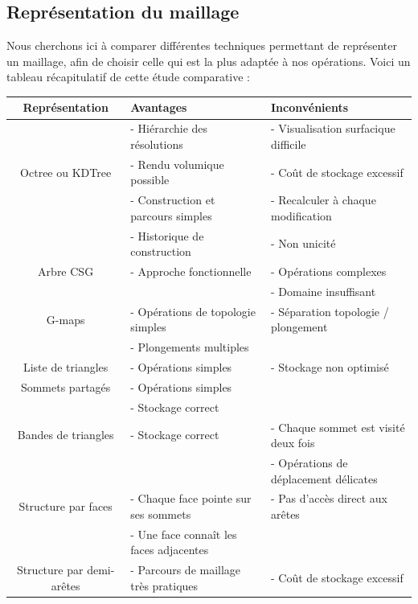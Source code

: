 \documentclass[a4paper]{memoir}
\begin{document}
			\subsection{Représentation du maillage}
				Nous cherchons ici à comparer différentes techniques permettant de représenter un maillage, afin de choisir celle qui est la plus adaptée à 
				nos opérations. Voici un tableau récapitulatif de cette étude comparative :
				\begin{table}[H]
					\begin{small}
						\hspace{-2,5cm}
						\begin{tabular}{| c | l | l |}
							\hline
							\textbf{Représentation} & \textbf{Avantages} & \textbf{Inconvénients}\\
							\hline
							 & - Hiérarchie des résolutions & - Visualisation surfacique difficile\\
							Octree ou KDTree & - Rendu volumique possible & - Coût de stockage excessif\\
							 & - Construction et parcours simples & - Recalculer à chaque modification\\
							\hline
							 & - Historique de construction & - Non unicité\\
							Arbre CSG & - Approche fonctionnelle & - Opérations complexes\\
							 &  & - Domaine insuffisant\\
							\hline
							G-maps & - Opérations de topologie simples & - Séparation topologie / plongement\\
							 & - Plongements multiples & \\
							\hline
							Liste de triangles & - Opérations simples & - Stockage non optimisé\\
							\hline
							Sommets partagés & - Opérations simples & \\
							 & - Stockage correct & \\
							\hline
							Bandes de triangles & - Stockage correct & - Chaque sommet est visité deux fois\\
							 &  & - Opérations de déplacement délicates\\
							\hline
							Structure par faces & - Chaque face pointe sur ses sommets & - Pas d'accès direct aux arêtes\\
							 & - Une face connaît les faces adjacentes & \\
							\hline
							Structure par demi-arêtes & - Parcours de maillage très pratiques & - Coût de stockage excessif\\

\end{tabular}
\end{small}
\end{table}
\end{document}
